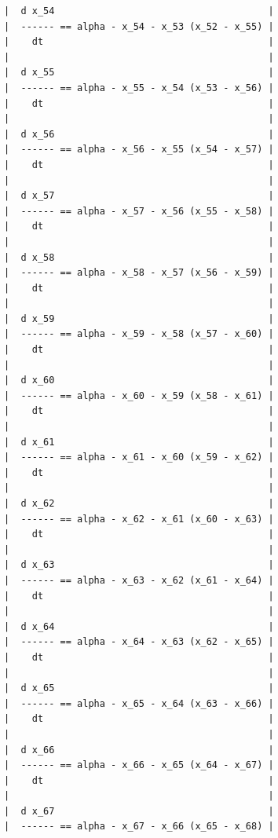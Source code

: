 {\begin{verbatim}
|  d x_54                                      |
|  ------ == alpha - x_54 - x_53 (x_52 - x_55) |
|    dt                                        |
|                                              |
|  d x_55                                      |
|  ------ == alpha - x_55 - x_54 (x_53 - x_56) |
|    dt                                        |
|                                              |
|  d x_56                                      |
|  ------ == alpha - x_56 - x_55 (x_54 - x_57) |
|    dt                                        |
|                                              |
|  d x_57                                      |
|  ------ == alpha - x_57 - x_56 (x_55 - x_58) |
|    dt                                        |
|                                              |
|  d x_58                                      |
|  ------ == alpha - x_58 - x_57 (x_56 - x_59) |
|    dt                                        |
|                                              |
|  d x_59                                      |
|  ------ == alpha - x_59 - x_58 (x_57 - x_60) |
|    dt                                        |
|                                              |
|  d x_60                                      |
|  ------ == alpha - x_60 - x_59 (x_58 - x_61) |
|    dt                                        |
|                                              |
|  d x_61                                      |
|  ------ == alpha - x_61 - x_60 (x_59 - x_62) |
|    dt                                        |
|                                              |
|  d x_62                                      |
|  ------ == alpha - x_62 - x_61 (x_60 - x_63) |
|    dt                                        |
|                                              |
|  d x_63                                      |
|  ------ == alpha - x_63 - x_62 (x_61 - x_64) |
|    dt                                        |
|                                              |
|  d x_64                                      |
|  ------ == alpha - x_64 - x_63 (x_62 - x_65) |
|    dt                                        |
|                                              |
|  d x_65                                      |
|  ------ == alpha - x_65 - x_64 (x_63 - x_66) |
|    dt                                        |
|                                              |
|  d x_66                                      |
|  ------ == alpha - x_66 - x_65 (x_64 - x_67) |
|    dt                                        |
|                                              |
|  d x_67                                      |
|  ------ == alpha - x_67 - x_66 (x_65 - x_68) |

\end{verbatim}}

